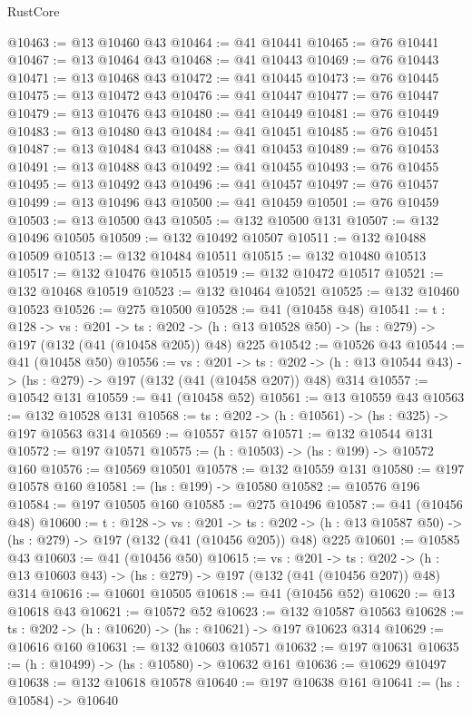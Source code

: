 \begin{lexlean}{RustCore}
\begin{coremodule}
@10463 := @13 @10460 @43
@10464 := @41 @10441
@10465 := @76 @10441
@10467 := @13 @10464 @43
@10468 := @41 @10443
@10469 := @76 @10443
@10471 := @13 @10468 @43
@10472 := @41 @10445
@10473 := @76 @10445
@10475 := @13 @10472 @43
@10476 := @41 @10447
@10477 := @76 @10447
@10479 := @13 @10476 @43
@10480 := @41 @10449
@10481 := @76 @10449
@10483 := @13 @10480 @43
@10484 := @41 @10451
@10485 := @76 @10451
@10487 := @13 @10484 @43
@10488 := @41 @10453
@10489 := @76 @10453
@10491 := @13 @10488 @43
@10492 := @41 @10455
@10493 := @76 @10455
@10495 := @13 @10492 @43
@10496 := @41 @10457
@10497 := @76 @10457
@10499 := @13 @10496 @43
@10500 := @41 @10459
@10501 := @76 @10459
@10503 := @13 @10500 @43
@10505 := @132 @10500 @131
@10507 := @132 @10496 @10505
@10509 := @132 @10492 @10507
@10511 := @132 @10488 @10509
@10513 := @132 @10484 @10511
@10515 := @132 @10480 @10513
@10517 := @132 @10476 @10515
@10519 := @132 @10472 @10517
@10521 := @132 @10468 @10519
@10523 := @132 @10464 @10521
@10525 := @132 @10460 @10523
@10526 := @275 @10500
@10528 := @41 (@10458 @48)
@10541 := {t : @128} ->
  {vs : @201} ->
  {ts : @202} -> (h : @13 @10528 @50) -> (hs : @279) -> @197 (@132 (@41 (@10458 @205)) @48) @225
@10542 := @10526 @43
@10544 := @41 (@10458 @50)
@10556 := {vs : @201} ->
  {ts : @202} -> (h : @13 @10544 @43) -> (hs : @279) -> @197 (@132 (@41 (@10458 @207)) @48) @314
@10557 := @10542 @131
@10559 := @41 (@10458 @52)
@10561 := @13 @10559 @43
@10563 := @132 @10528 @131
@10568 := {ts : @202} -> (h : @10561) -> (hs : @325) -> @197 @10563 @314
@10569 := @10557 @157
@10571 := @132 @10544 @131
@10572 := @197 @10571
@10575 := (h : @10503) -> (hs : @199) -> @10572 @160
@10576 := @10569 @10501
@10578 := @132 @10559 @131
@10580 := @197 @10578 @160
@10581 := (hs : @199) -> @10580
@10582 := @10576 @196
@10584 := @197 @10505 @160
@10585 := @275 @10496
@10587 := @41 (@10456 @48)
@10600 := {t : @128} ->
  {vs : @201} ->
  {ts : @202} -> (h : @13 @10587 @50) -> (hs : @279) -> @197 (@132 (@41 (@10456 @205)) @48) @225
@10601 := @10585 @43
@10603 := @41 (@10456 @50)
@10615 := {vs : @201} ->
  {ts : @202} -> (h : @13 @10603 @43) -> (hs : @279) -> @197 (@132 (@41 (@10456 @207)) @48) @314
@10616 := @10601 @10505
@10618 := @41 (@10456 @52)
@10620 := @13 @10618 @43
@10621 := @10572 @52
@10623 := @132 @10587 @10563
@10628 := {ts : @202} -> (h : @10620) -> (hs : @10621) -> @197 @10623 @314
@10629 := @10616 @160
@10631 := @132 @10603 @10571
@10632 := @197 @10631
@10635 := (h : @10499) -> (hs : @10580) -> @10632 @161
@10636 := @10629 @10497
@10638 := @132 @10618 @10578
@10640 := @197 @10638 @161
@10641 := (hs : @10584) -> @10640

\end{coremodule}
\end{lexlean}
